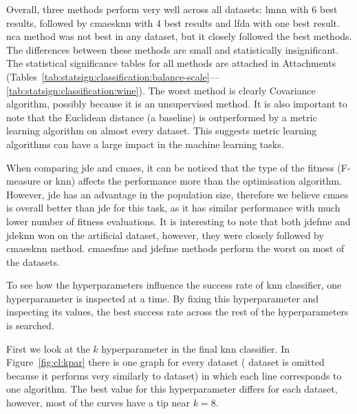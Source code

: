 Overall, three methods perform very well across all datasets: \ac{lmnn} with 6 best results, followed by \ac{cmaesknn} with 4 best results and \ac{lfda} with one best result. \ac{nca} method was not best in any dataset, but it closely followed the best methods. The differences between these methods are small and statistically insignificant. The statistical significance tables for all methods are attached in Attachments (Tables~\ref{tab:statsign:classification:balance-scale}---\ref{tab:statsign:classification:wine}). The worst method is clearly Covariance algorithm, possibly because it is an unsupervised method. It is also important to note that the Euclidean distance (a baseline) is outperformed by a metric learning algorithm on almost every dataset. This suggests metric learning algorithms can have a large impact in the machine learning tasks.

When comparing \ac{jde} and \ac{cmaes}, it can be noticed that the type of the fitness (\mbox{F-measure} or \ac{knn}) affects the performance more than the optimisation algorithm. However, \ac{jde} has an advantage in the population size, therefore we believe \ac{cmaes} is overall better than \ac{jde} for this task, as it has similar performance with much lower number of fitness evaluations. It is interesting to note that both \ac{jdefme} and \ac{jdeknn} won on the artificial  dataset, however, they were closely followed by \ac{cmaesknn} method. \ac{cmaesfme} and \ac{jdefme} methods perform the worst on most of the datasets.



\clearpage

To see how the hyperparameters influence the success rate of \ac{knn} classifier, one hyperparameter is inspected at a time. By fixing this hyperparameter and inspecting its values, the best success rate across the rest of the hyperparameters is searched.

First we look at the $k$ hyperparameter in the final \ac{knn} classifier. In Figure~\ref{fig:cl:kpar} there is one graph for every dataset ( dataset is omitted because it performs very similarly to  dataset) in which each line corresponds to one algorithm. The best value for this hyperparameter differs for each dataset, however, most of the curves have a tip near $k=8$.

